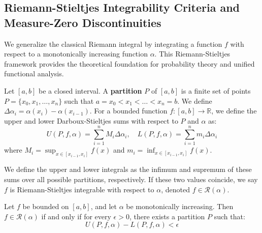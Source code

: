 \subsection{Riemann-Stieltjes Integrability Criteria and Measure-Zero Discontinuities}

We generalize the classical Riemann integral by integrating a function $f$ with respect to a monotonically increasing function $\alpha$. This Riemann-Stieltjes framework provides the theoretical foundation for probability theory and unified functional analysis.

\begin{definition}
Let $[a, b]$ be a closed interval. A \textbf{partition} $P$ of $[a, b]$ is a finite set of points $P = \{x_0, x_1, \dots, x_n\}$ such that $a = x_0 < x_1 < \dots < x_n = b$. We define $\Delta \alpha_i = \alpha(x_i) - \alpha(x_{i-1})$. For a bounded function $f: [a, b] \to \mathbb{R}$, we define the upper and lower Darboux-Stieltjes sums with respect to $P$ and $\alpha$ as:
\[
U(P, f, \alpha) = \sum_{i=1}^n M_i \Delta \alpha_i, \quad L(P, f, \alpha) = \sum_{i=1}^n m_i \Delta \alpha_i
\]
where $M_i = \sup_{x \in [x_{i-1}, x_i]} f(x)$ and $m_i = \inf_{x \in [x_{i-1}, x_i]} f(x)$.
\end{definition}

We define the upper and lower integrals as the infimum and supremum of these sums over all possible partitions, respectively. If these two values coincide, we say $f$ is Riemann-Stieltjes integrable with respect to $\alpha$, denoted $f \in \mathcal{R}(\alpha)$.

\begin{theorem}
Let $f$ be bounded on $[a, b]$, and let $\alpha$ be monotonically increasing. Then $f \in \mathcal{R}(\alpha)$ if and only if for every $\epsilon > 0$, there exists a partition $P$ such that:
\[
U(P, f, \alpha) - L(P, f, \alpha) < \epsilon
\]
\end{theorem}

